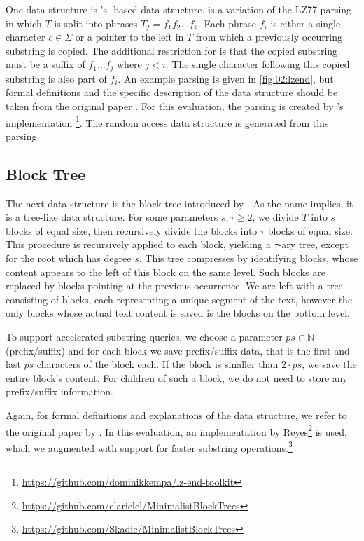 \documentclass{scrartcl}
\begin{document}
One data structure is \citeauthor{kreft_self-index_2011}'s \lzend{}-based data structure.
\lzend{} is a variation of the LZ77 parsing \cite{ziv_universal_1977} in which $T$ is split into phrases $T_f = f_1 f_2 \dots f_k$.
Each phrase $f_i$ is either a single character $c \in \Sigma$ or a pointer to the left in $T$ from which a previously occurring substring is copied. The additional restriction for \lzend{} is that the copied substring must be a suffix of $f_1 \dots f_j$ where $j < i$.
The single character following this copied substring is also part of $f_i$.
An example parsing is given in \cref{fig:02:lzend}, but formal definitions and the specific description of the data structure should be taken from the original paper \cite{kreft_self-index_2011}.
For this evaluation, the parsing is created by \citeauthor{kempa_lz-end_2017}'s implementation \cite{kempa_lz-end_2017}\footnote{\url{https://github.com/dominikkempa/lz-end-toolkit}}.
The random access data structure is generated from this parsing.

\subsection{Block Tree}

The next data structure is the block tree introduced by \citeauthor{belazzougui_block_2021} \cite{belazzougui_block_2021}.
As the name implies, it is a tree-like data structure.
For some parameters $s, \tau \geq 2$, we divide $T$ into $s$ blocks of equal size, then recursively divide the blocks into $\tau$ blocks of equal size.
This procedure is recursively applied to each block, yielding a $\tau$-ary tree, except for the root which has degree $s$.
This tree compresses by identifying blocks, whose content appears to the left of this block on the same level.
Such blocks are replaced by blocks pointing at the previous occurrence.
We are left with a tree consisting of blocks, each representing a unique segment of the text, however the only blocks whose actual text content is saved is the blocks on the bottom level.

To support accelerated substring queries, we choose a parameter $ps \in \mathbb{N}$ (prefix/suffix) and for each block we save prefix/suffix data, that is the first and last $ps$ characters of the block each.
If the block is smaller than $2 \cdot ps$, we save the entire block's content.
For children of such a block, we do not need to store any prefix/suffix information.

Again, for formal definitions and explanations of the data structure, we refer to the original paper by \citeauthor{belazzougui_block_2021} \cite{belazzougui_block_2021}.
In this evaluation, an implementation by Reyes\footnote{\url{https://github.com/elarielcl/MinimalistBlockTrees}} is used, which we augmented with support for faster substring operations.\footnote{\url{https://github.com/Skadic/MinimalistBlockTrees}}
\end{document}
